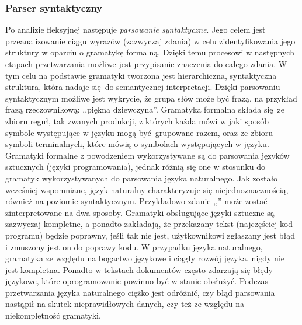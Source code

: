 \documentclass[a4paper, twoside, 12pt]{report}
\begin{document}
            \subsubsection{Parser syntaktyczny}
                Po analizie fleksyjnej następuje \emph{parsowanie syntaktyczne}. Jego celem jest przeanalizowanie ciągu wyrazów
                (zazwyczaj zdania) w celu zidentyfikowania jego struktury w oparciu o gramatykę formalną. Dzięki temu procesowi
                w następnych etapach przetwarzania możliwe jest przypisanie znaczenia do całego zdania. W tym celu na podstawie
                gramatyki tworzona jest hierarchiczna, syntaktyczna struktura, która nadaje się do semantycznej interpretacji.
                Dzięki parsowaniu syntaktycznym możliwe jest wykrycie, że grupa słów może być frazą, na przykład frazą
                rzeczownikową: ,,piękna dziewczyna''.
                Gramatyka formalna składa się ze zbioru reguł, tak zwanych produkcji, z których każda mówi w jaki sposób symbole występujące
                w języku mogą być grupowane razem, oraz ze zbioru symboli terminalnych, które mówią o symbolach występujących
                w języku.
                Gramatyki formalne z powodzeniem wykorzystywane są do parsowania języków sztucznych (języki programowania),
                jednak różnią się one w stosunku do gramatyk wykorzystywanych do parsowania języka naturalnego. Jak zostało
                wcześniej wspomniane, język naturalny charakteryzuje się niejednoznacznością, również na poziomie syntaktycznym.
                Przykładowo zdanie ,,'' może zostać zinterpretowane na dwa sposoby.
                Gramatyki obsługujące języki sztuczne są zazwyczaj kompletne, a ponadto zakładają, że przekazany tekst
                (najczęściej kod programu) będzie poprawny, jeśli tak nie jest, użytkownikowi zgłaszany jest błąd i zmuszony
                jest on do poprawy kodu. W przypadku języka naturalnego, gramatyka ze względu na bogactwo językowe i ciągły
                rozwój języka, nigdy nie jest kompletna. Ponadto w tekstach dokumentów często zdarzają się błędy językowe,
                które oprogramowanie powinno być w stanie obsłużyć. Podczas przetwarzania języka naturalnego ciężko jest odróżnić,
                czy błąd parsowania nastąpił na skutek nieprawidłowych danych, czy też ze względu na niekompletność gramatyki.
\end{document}

